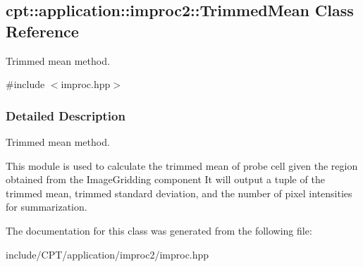 \hypertarget{classcpt_1_1application_1_1improc2_1_1_trimmed_mean}{\subsection{cpt\-:\-:application\-:\-:improc2\-:\-:Trimmed\-Mean Class Reference}
\label{classcpt_1_1application_1_1improc2_1_1_trimmed_mean}
}


Trimmed mean method.  




{\ttfamily \#include $<$improc.\-hpp$>$}



\subsubsection{Detailed Description}
Trimmed mean method. 

This module is used to calculate the trimmed mean of probe cell given the region obtained from the Image\-Gridding component It will output a tuple of the trimmed mean, trimmed standard deviation, and the number of pixel intensities for summarization. 

The documentation for this class was generated from the following file\-:\begin{DoxyCompactItemize}
\item 
include/\-C\-P\-T/application/improc2/improc.\-hpp\end{DoxyCompactItemize}
